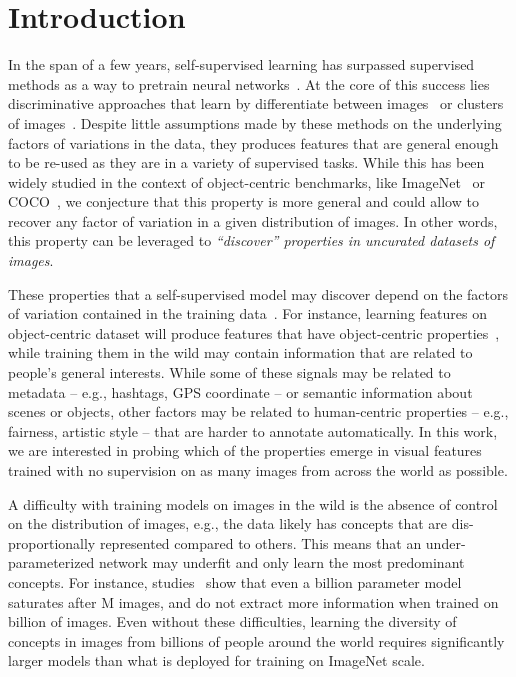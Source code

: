 \documentclass[10pt,twocolumn,letterpaper]{article}
\begin{document}
\section{Introduction}
In the span of a few years, self-supervised learning has surpassed supervised methods as a way to pretrain neural networks~\cite{chen2020simple, he2020momentum, caron2020unsupervised, grill2020bootstrap}.
At the core of this success lies discriminative approaches that learn by differentiate between images~\cite{dosovitskiy2014disc, wu2018unsupervised} or clusters of images~\cite{caron2018deep, asano2019self}.
Despite little assumptions made by these methods on the underlying factors of variations in the data, they produces features that are general enough to be re-used as they are in a variety of supervised tasks.
While this has been widely studied in the context of object-centric benchmarks, like ImageNet~\cite{russakovsky2015imagenet} or COCO~\cite{lin2014microsoft}, we conjecture that this property is more general and could allow to recover any factor of variation in a given distribution of images.
In other words, this property can be leveraged to \textit{``discover'' properties in uncurated datasets of images}. 

These properties that a self-supervised model may discover depend on the factors of variation contained in the training data~\cite{bouchacourt2021grounding}. 
For instance, learning features on object-centric dataset will produce features that have object-centric properties~\cite{caron2021emerging}, while training them in the wild may contain information that are related to people's general interests.
While some of these signals may be related to metadata -- e.g., hashtags, GPS coordinate --  or semantic information about scenes or objects, other factors may be related to human-centric properties -- e.g., fairness, artistic style -- that are harder to annotate automatically.
In this work, we are interested in probing which of the properties emerge in visual features trained with no supervision on as many images from across the world as possible.

A difficulty with training models on images in the wild is the absence of control on the distribution of images, e.g., the data likely has concepts that are dis-proportionally represented compared to others.
This means that an under-parameterized network may underfit and only learn the most predominant concepts.
For instance, studies~\cite{goyal2021self} show that even a  billion parameter model saturates after M images, and do not extract more information when trained on billion of images.
Even without these difficulties, learning the diversity of concepts in images from billions of people around the world requires significantly larger models than what is deployed for training on ImageNet scale. 
\end{document}
